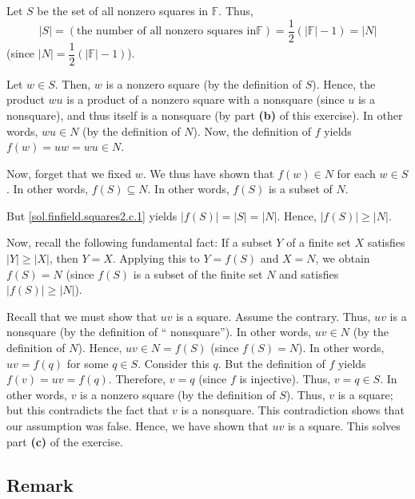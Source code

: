 \documentclass[paper=a4, fontsize=12pt]{scrartcl}%
\theoremstyle{plainsl}
\theoremstyle{definition}
\theoremstyle{remark}
\begin{document}
Let $S$ be the set of all nonzero squares in $\mathbb{F}$. Thus,
\[
\left\vert S\right\vert =\left(  \text{the number of all nonzero squares in
}\mathbb{F}\right)  =\dfrac{1}{2}\left(  \left\vert \mathbb{F}\right\vert
-1\right)  =\left\vert N\right\vert
\]
(since $\left\vert N\right\vert =\dfrac{1}{2}\left(  \left\vert \mathbb{F}%
\right\vert -1\right)  $).

Let $w\in S$. Then, $w$ is a nonzero square (by the definition of $S$). Hence,
the product $wu$ is a product of a nonzero square with a nonsquare (since $u$
is a nonsquare), and thus itself is a nonsquare (by part \textbf{(b)} of this
exercise). In other words, $wu\in N$ (by the definition of $N$). Now, the
definition of $f$ yields $f\left(  w\right)  =uw = wu \in N$.

Now, forget that we fixed $w$. We thus have shown that $f\left(  w\right)  \in
N$ for each $w\in S$. In other words, $f\left(  S\right)  \subseteq N$. In
other words, $f\left(  S\right)  $ is a subset of $N$.

But \eqref{sol.finfield.squares2.c.1} yields $\left\vert f\left(  S\right)
\right\vert =\left\vert S\right\vert = \left|  N \right|  $. Hence,
$\left\vert f\left(  S\right)  \right\vert \geq\left\vert N\right\vert $.

Now, recall the following fundamental fact: If a subset $Y$ of a finite set
$X$ satisfies $\left\vert Y\right\vert \geq\left\vert X\right\vert $, then
$Y=X$. Applying this to $Y=f\left(  S\right)  $ and $X=N$, we obtain $f\left(
S\right)  =N$ (since $f\left(  S\right)  $ is a subset of the finite set $N$
and satisfies $\left\vert f\left(  S\right)  \right\vert \geq\left\vert
N\right\vert $).

Recall that we must show that $uv$ is a square. Assume the contrary. Thus,
$uv$ is a nonsquare (by the definition of \textquotedblleft
nonsquare\textquotedblright). In other words, $uv\in N$ (by the definition of
$N$). Hence, $uv\in N=f\left(  S\right)  $ (since $f\left(  S\right)  =N$). In
other words, $uv=f\left(  q\right)  $ for some $q\in S$. Consider this $q$.
But the definition of $f$ yields $f\left(  v\right)  =uv=f\left(  q\right)  $.
Therefore, $v=q$ (since $f$ is injective). Thus, $v=q\in S$. In other words,
$v$ is a nonzero square (by the definition of $S$). Thus, $v$ is a square; but
this contradicts the fact that $v$ is a nonsquare. This contradiction shows
that our assumption was false. Hence, we have shown that $uv$ is a square.
This solves part \textbf{(c)} of the exercise.

\subsection{Remark}
\end{document}
